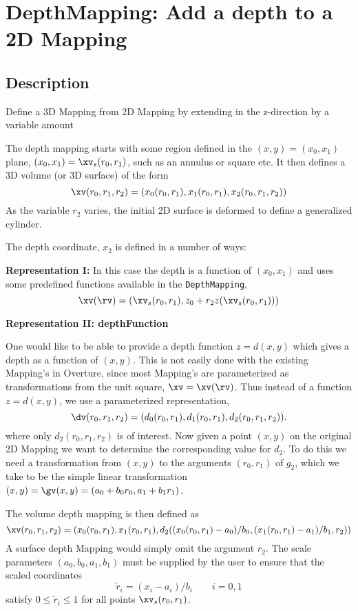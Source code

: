 \section{DepthMapping: Add a depth to a 2D Mapping}

\subsection{Description}

 Define a 3D Mapping from 2D Mapping by extending in 
the z-direction by a variable amount

The depth mapping starts with some region defined in the $(x,y)=(x_0,x_1)$ plane, $(x_0,x_1)=\xv_s(r_0,r_1)$, such as
an annulus or square etc. It then defines a 3D volume (or 3D surface) of the form
\[
               \xv(r_0,r_1,r_2) = ( x_0(r_0,r_1), x_1(r_0,r_1), x_2(r_0,r_1,r_2) )
\]
As the variable $r_2$ varies, the initial 2D surface is deformed to define a generalized cylinder.


The depth coordinate, $x_2$ is defined in a number of ways:

{\bf Representation I: } In this case the depth is a function of $(x_0,x_1)$ and uses some predefined
functions available in the {\tt DepthMapping},
\[
     \xv(\rv) = (\xv_s(r_0,r_1), z_0 + r_2 z(\xv_s(r_0,r_1)) )
\]

{\bf Representation II: depthFunction}

One would like to be able to provide a depth function $z=d(x,y)$ which gives a depth as a function
of $(x,y)$. This is not easily done with the existing Mapping's in Overture, since most Mapping's are
parameterized as transformations from the unit square, $\xv=\xv(\rv)$. 
Thus instead of a function $z=d(x,y)$, we use a parameterized representation,
\[
\dv(r_0,r_1,r_2)=(d_0(r_0,r_1),d_1(r_0,r_1),d_2(r_0,r_1,r_2)).
\]
where only $d_2(r_0,r_1,r_2)$ is of interest. Now given a point $(x,y)$ on the original 2D Mapping
we want to determine the corresponding value for $d_2$. To do this we need a transformation from
$(x,y)$ to the arguments $(r_0,r_1)$ of $g_2$, which we take to be the simple linear transformation
 $(x,y) = \gv(x,y) = ( a_0 + b_0 r_0, a_1 + b_1 r_1 )$.

The volume depth mapping is then defined as
\[
   \xv(r_0,r_1,r_2) = \left( x_0(r_0,r_1), x_1(r_0,r_1), 
         d_2( (x_0(r_0,r_1)-a_0)/b_0 , (x_1(r_0,r_1)-a_1)/b_1,r_2) \right)
\]
A surface depth Mapping would simply omit the argument $r_2$.
The scale parameters $(a_0,b_0,a_1,b_1)$ must be supplied by the user to ensure
that the scaled coordinates
\[
   \tilde{r}_i = (x_i-a_i)/b_i \qquad i=0,1
\]
satisfy $0 \le \tilde{r}_i \le 1$ for all points $\xv_s(r_0,r_1)$.

